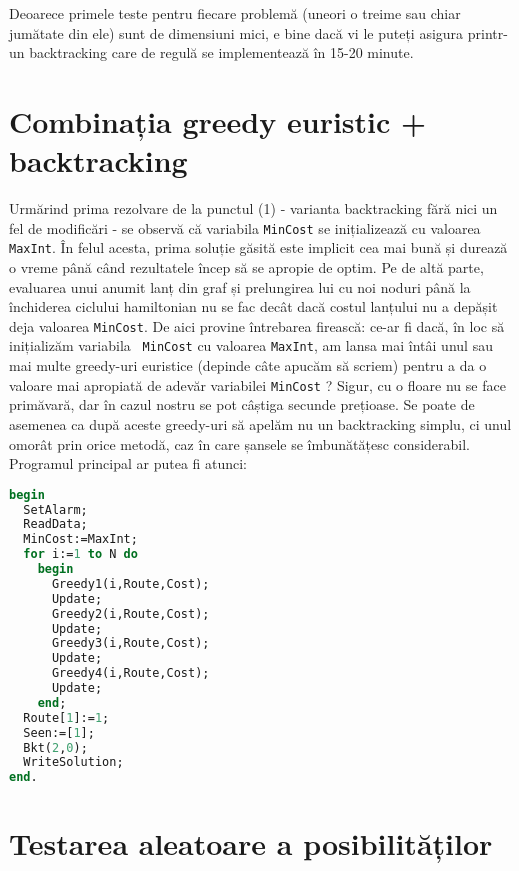 Deoarece primele teste pentru fiecare problemă (uneori o treime sau chiar
jumătate din ele) sunt de dimensiuni mici, e bine dacă vi le puteți asigura
printr-un backtracking care de regulă se implementează în 15-20 minute.

\section{Combinația greedy euristic + backtracking}

Urmărind prima rezolvare de la punctul (1) - varianta backtracking fără nici
un fel de modificări - se observă că variabila {\tt MinCost} se inițializează
cu valoarea {\tt MaxInt}. În felul acesta, prima soluție găsită este implicit
cea mai bună și durează o vreme până când rezultatele încep să se apropie de
optim. Pe de altă parte, evaluarea unui anumit lanț din graf și prelungirea
lui cu noi noduri până la închiderea ciclului hamiltonian nu se fac decât dacă
costul lanțului nu a depășit deja valoarea {\tt MinCost}. De aici provine
întrebarea firească: ce-ar fi dacă, în loc să inițializăm variabila {\tt
  MinCost} cu valoarea {\tt MaxInt}, am lansa mai întâi unul sau mai multe
greedy-uri euristice (depinde câte apucăm să scriem) pentru a da o valoare mai
apropiată de adevăr variabilei {\tt MinCost} ? Sigur, cu o floare nu se face
primăvară, dar în cazul nostru se pot câștiga secunde prețioase. Se poate de
asemenea ca după aceste greedy-uri să apelăm nu un backtracking simplu, ci
unul omorât prin orice metodă, caz în care șansele se îmbunătățesc
considerabil. Programul principal ar putea fi atunci:

\begin{lstlisting}[language=Pascal]
begin
  SetAlarm;
  ReadData;
  MinCost:=MaxInt;
  for i:=1 to N do
    begin
      Greedy1(i,Route,Cost);
      Update;
      Greedy2(i,Route,Cost);
      Update;
      Greedy3(i,Route,Cost);
      Update;
      Greedy4(i,Route,Cost);
      Update;
    end;
  Route[1]:=1;
  Seen:=[1];
  Bkt(2,0);
  WriteSolution;
end.
\end{lstlisting}

\section{Testarea aleatoare a posibilităților}

